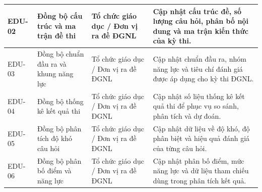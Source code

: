 \begin{longtable}{|p{}|p{}|p{}|p{}|}
EDU-02 &
Đồng bộ cấu trúc và ma trận đề thi &
Tổ chức giáo dục / Đơn vị ra đề ĐGNL &
Cập nhật cấu trúc đề, số lượng câu hỏi, phân bố nội dung và ma trận kiến thức của kỳ thi. \\
\hline

EDU-03 &
Đồng bộ chuẩn đầu ra và khung năng lực &
Tổ chức giáo dục / Đơn vị ra đề ĐGNL &
Cập nhật chuẩn đầu ra, nhóm năng lực và tiêu chí đánh giá được áp dụng cho kỳ thi ĐGNL. \\
\hline

EDU-04 &
Đồng bộ thống kê kết quả thi &
Tổ chức giáo dục / Đơn vị ra đề ĐGNL &
Cập nhật số liệu thống kê kết quả thi để phục vụ so sánh, phân tích và dự đoán. \\
\hline

EDU-05 &
Đồng bộ phân tích độ khó câu hỏi &
Tổ chức giáo dục / Đơn vị ra đề ĐGNL &
Cập nhật dữ liệu về độ khó, độ phân biệt và hiệu quả đánh giá của từng câu hỏi. \\
\hline

EDU-06 &
Đồng bộ phân bố điểm và năng lực &
Tổ chức giáo dục / Đơn vị ra đề ĐGNL &
Cập nhật phân bố điểm, mức năng lực và dữ liệu tham chiếu dùng trong phân tích kết quả. \\
\hline

\end{longtable}

\normalsize